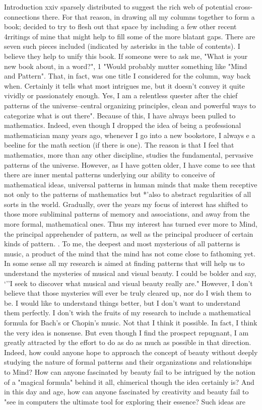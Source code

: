 Introduction                                                                         xxiv sparsely distributed to suggest the rich web of potential cross-connections there. For that reason, in drawing all my columns together to form a book; decided to try to flesh out that space by including a few other recent 4rritings of mine that might help to fill some of the more blatant gaps. There are seven such pieces included (indicated by asterisks in the table of contents). I believe they help to unify this book. If someone were to ask me, "What is your new book about, in a word?", 1 "Would probably mutter something like "Mind and Pattern". That, in fact, was one title I considered for the column, way back when. Certainly it tells what most intrigues me, but it doesn't convey it quite vividly or passionately enough. Yes, I am a relentless quester after the chief patterns of the universe--central organizing principles, clean and powerful ways to categorize what is out there". Because of this, I have always been pulled to mathematics. Indeed, even though I dropped the idea of being a professional mathematician many years ago, whenever I go into a new bookstore, I always e a beeline for the math section (if there is one). The reason is that I feel that mathematics, more than any other discipline, studies the fundamental, pervasive patterns of the universe. However, as I have gotten older, I have come to see that there are inner mental patterns underlying our ability to conceive of mathematical ideas, universal patterns in human minds that make them receptive not only to the patterns of mathematics but *'also to abstract regularities of all sorts in the world. Gradually, over the years my focus of interest has shifted to those more subliminal patterns of memory and associations, and away from the more formal, mathematical ones. Thus my interest has turned ever more to Mind, the principal apprehender of pattern, as well as the principal producer of certain kinds of pattern. . To me, the deepest and most mysterious of all patterns is music, a product of the mind that the mind has not come close to fathoming yet. In some sense all my research is aimed at finding patterns that will help us to understand the mysteries of musical and visual beauty. I could be bolder and say, `''I seek to discover what musical and visual beauty really are." However, I don't believe that those mysteries will ever be truly cleared up, nor do I wish them to be. I would like to understand things better, but I don't want to understand them perfectly. I don't wish the fruits of my research to include a mathematical formula for Bach's or Chopin's music. Not that I think it possible. In fact, I think the very idea is nonsense. But even though I find the prospect repugnant, I am greatly attracted by the effort to do as do as much as possible in that direction. Indeed, how could anyone hope to approach the concept of beauty without deeply studying the nature of formal patterns and their organizations and relationships to Mind? How can anyone fascinated by beauty fail to be intrigued by the notion of a "magical formula" behind it all, chimerical though the idea certainly is? And in this day and age, how can anyone fascinated by creativity and beauty fail to "see in computers the ultimate tool for exploring their essence? Such ideas are 
